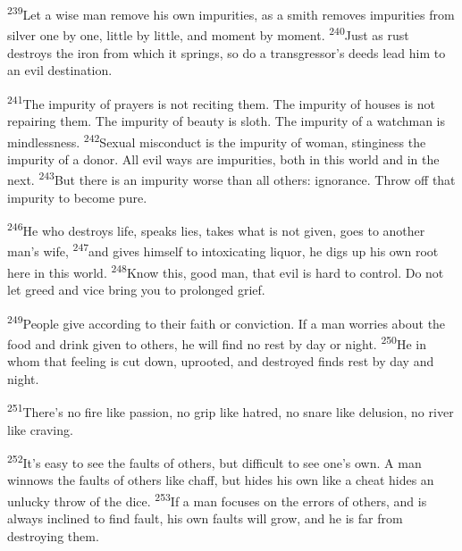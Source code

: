\documentclass[openany,12pt,english]{book}
\newenvironment{para}{\par\pretolerance=100\tolerance=200\setlength{\emergencystretch}{0.6em}\relax}{\par}
\begin{document}
\begin{para}
    \textsuperscript{239}\thinspace{}Let a wise man re\-move his own impurities, as a smith removes impurities from sil\-ver one by one, lit\-tle by lit\-tle, and mo\-ment by mo\-ment.
    \textsuperscript{240}\thinspace{}Just as rust destroys the i\-ron from which it springs, so do a transgressor's deeds lead him to an evil des\-ti\-na\-tion.
\end{para}

\begin{para}
    \textsuperscript{241}\thinspace{}The im\-pu\-ri\-ty of prayers is not re\-cit\-ing them. The im\-pu\-ri\-ty of hous\-es is not repairing them. The im\-pu\-ri\-ty of beau\-ty is sloth. The im\-pu\-ri\-ty of a watch\-man is mind\-less\-ness.
    \textsuperscript{242}\thinspace{}Sex\-u\-al mis\-con\-duct is the im\-pu\-ri\-ty of wom\-an, stin\-gi\-ness the im\-pu\-ri\-ty of a do\-nor. All evil ways are impurities, both in this world and in the next.
    \textsuperscript{243}\thinspace{}But there is an im\-pu\-ri\-ty worse than all others: ig\-no\-rance. Throw off that im\-pu\-ri\-ty to be\-come pure.
\end{para}

\begin{para}
    \textsuperscript{246}\thinspace{}He who destroys life, speaks lies, takes what is not giv\-en, goes to an\-oth\-er man's wife,
    \textsuperscript{247}\thinspace{}and gives him\-self to in\-tox\-i\-cat\-ing liq\-uor, he digs up his own root here in this world.
    \textsuperscript{248}\thinspace{}Know this, good man, that evil is hard to con\-trol. Do not let greed and vi\-ce bring you to prolonged grief.
\end{para}

\begin{para}
    \textsuperscript{249}\thinspace{}Peo\-ple give ac\-cord\-ing to their faith or con\-vic\-tion. If a man worries a\-bout the food and drink giv\-en to others, he will find no rest by day or night.
    \textsuperscript{250}\thinspace{}He in whom that feel\-ing is cut down, uprooted, and destroyed finds rest by day and night.
\end{para}

\begin{para}
    \textsuperscript{251}\thinspace{}There's no fire like pas\-sion, no grip like ha\-tred, no snare like de\-lu\-sion, no riv\-er like crav\-ing.
\end{para}

\begin{para}
    \textsuperscript{252}\thinspace{}It's eas\-y to see the faults of others, but dif\-fi\-cult to see one's own. A man winnows the faults of others like chaff, but hides his own like a cheat hides an un\-luck\-y throw of the dice.
    \textsuperscript{253}\thinspace{}If a man fo\-cus\-es on the errors of others, and is al\-ways in\-clined to find fault, his own faults will grow, and he is far from destroying them.
\end{para}
\end{document}
